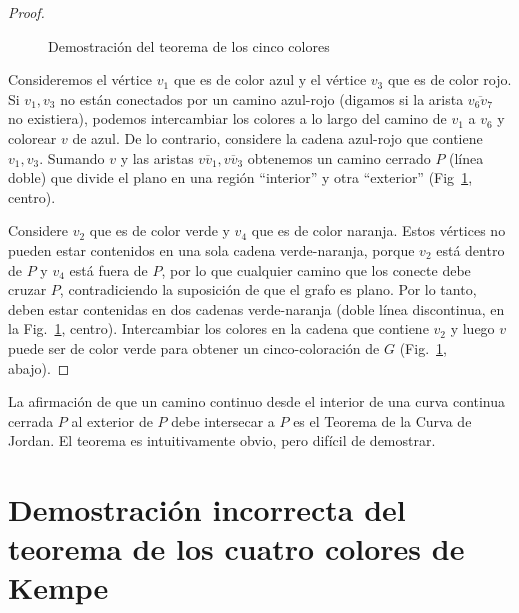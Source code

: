 {{\begin{proof}
\begin{figure}
\begin{center}
\end{center}
\caption{Demostración del teorema de los cinco colores}\label{f.five-color-proof}
\end{figure}

Consideremos el vértice $v_1$ que es de color azul y el vértice $v_3$ que es de color rojo. Si $v_1,v_3$ no están conectados por un camino azul-rojo (digamos si la arista $\overline{v_6v_7}$ no existiera), podemos intercambiar los colores a lo largo del camino de $v_1$ a $v_6$ y colorear $v$ de azul. De lo contrario, considere la cadena azul-rojo que contiene $v_1,v_3$. Sumando $v$ y las aristas $\overline{vv_1},\overline{vv_3}$ obtenemos un camino cerrado $P$ (línea doble) que divide el plano en una región ``interior'' y otra ``exterior'' (Fig~\ref{f.five-color-proof}, centro).

Considere $v_2$ que es de color verde y $v_4$ que es de color naranja. Estos vértices no pueden estar contenidos en una sola cadena verde-naranja, porque $v_2$ está dentro de $P$ y $v_4$ está fuera de $P$, por lo que cualquier camino que los conecte debe cruzar $P$, contradiciendo la suposición de que el grafo es plano. Por lo tanto, deben estar contenidas en dos cadenas verde-naranja (doble línea discontinua, en la Fig.~\ref{f.five-color-proof}, centro).
Intercambiar los colores en la cadena que contiene $v_2$ y luego $v$ puede ser de color verde para obtener un cinco-coloración de $G$ (Fig.~\ref{f.five-color-proof}, abajo).
\end{proof}

\begin{advanced}
La afirmación de que un camino continuo desde el interior de una curva continua cerrada $P$ al exterior de $P$ debe intersecar a $P$ es el Teorema de la Curva de Jordan. El teorema es intuitivamente obvio, pero difícil de demostrar.
\end{advanced}


\section{Demostración incorrecta del teorema de los cuatro colores de Kempe}\label{s.kempe}

}}
